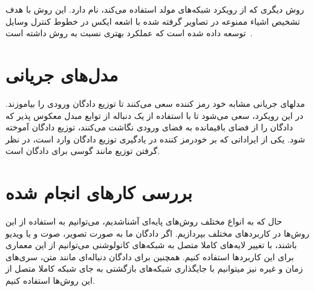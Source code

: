 \documentclass[12pt,a4paper]{report}
\theoremstyle{definition}
\theoremstyle{definition}
\begin{document}
روش دیگری که از رویکرد شبکه‌های مولد استفاده می‌کند،  نام دارد. این روش با هدف تشخیص اشیاء ممنوعه در تصاویر گرفته شده با اشعه ایکس در خطوط کنترل وسایل توسعه داده شده است که عملکرد بهتری نسبت به روش داشته است~\cite{akcay2018ganomaly}.
\section{مدل‌های جریانی}
مدلهای جریانی مشابه خود رمز کننده  سعی می‌کنند تا توزیع دادگان ورودی را بیاموزند. در این رویکرد، سعی می‌شود تا با استفاده از یک دنباله از توابع مبدل معکوس پذیر که دادگان را از فضای باقیمانده به فضای ورودی نگاشت می‌کنند، توزیع دادگان آموخته شود. یکی از ایراداتی که بر خودرمز کننده  در یادگیری توزیع دادگان وارد است، در نظر گرفتن توزیع مانند گوسی برای دادگان است.
\section{بررسی کار‌های انجام شده}
حال که به انواع مختلف روش‌های پایه‌ای آشناشدیم، می‌توانیم به استفاده از این روش‌ها در کاربردهای مختلف بپردازیم. اگر دادگان ما به صورت تصویر، صوت و یا ویدیو باشند، با تغییر لایه‌های کاملا متصل به شبکه‌‌های کانولوشنی می‌توانیم از این معماری برای این کاربرد‌ها استفاده کنیم. همچنین برای دادگان دنباله‌ای مانند متن، سری‌های زمان و غیره نیز میتوانیم با جایگذاری شبکه‌های بازگشتی به جای شبکه کاملا متصل از این روش‌ها استفاده کنیم.
\end{document}
